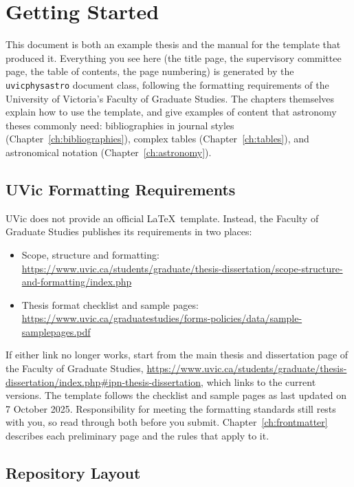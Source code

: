 \chapter{Getting Started}
\label{ch:getting-started}

This document is both an example thesis and the manual for the template that produced it. Everything you see here (the title page, the supervisory committee page, the table of contents, the page numbering) is generated by the \texttt{uvicphysastro} document class, following the formatting requirements of the University of Victoria's Faculty of Graduate Studies. The chapters themselves explain how to use the template, and give examples of content that astronomy theses commonly need: bibliographies in journal styles (Chapter~\ref{ch:bibliographies}), complex tables (Chapter~\ref{ch:tables}), and astronomical notation (Chapter~\ref{ch:astronomy}).
\section{UVic Formatting Requirements}
\label{sec:uvic-requirements}

UVic does not provide an official \LaTeX\ template. Instead, the Faculty of Graduate Studies publishes its requirements in two places:
\begin{itemize}
    \item Scope, structure and formatting: \url{https://www.uvic.ca/students/graduate/thesis-dissertation/scope-structure-and-formatting/index.php}
    \item Thesis format checklist and sample pages: \url{https://www.uvic.ca/graduatestudies/forms-policies/data/sample-samplepages.pdf}
\end{itemize}
If either link no longer works, start from the main thesis and dissertation page of the Faculty of Graduate Studies, \url{https://www.uvic.ca/students/graduate/thesis-dissertation/index.php#ipn-thesis-dissertation}, which links to the current versions.
The template follows the checklist and sample pages as last updated on 7 October 2025. Responsibility for meeting the formatting standards still rests with you, so read through both before you submit. Chapter~\ref{ch:frontmatter} describes each preliminary page and the rules that apply to it.

\section{Repository Layout}
\label{sec:layout}


